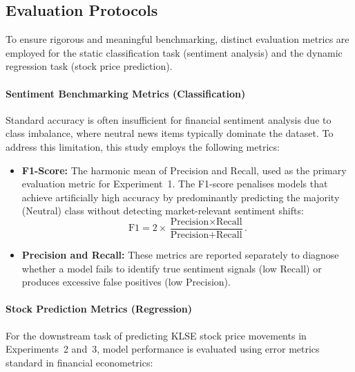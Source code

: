 \documentclass[12pt]{ucetd}
\begin{document}
\subsection{Evaluation Protocols}

To ensure rigorous and meaningful benchmarking, distinct evaluation metrics are employed for the static classification task (sentiment analysis) and the dynamic regression task (stock price prediction).

\paragraph{Sentiment Benchmarking Metrics (Classification)}

Standard accuracy is often insufficient for financial sentiment analysis due to class imbalance, where neutral news items typically dominate the dataset. To address this limitation, this study employs the following metrics:

\begin{itemize}
    \item \textbf{F1-Score:}
    The harmonic mean of Precision and Recall, used as the primary evaluation metric for Experiment~1. The F1-score penalises models that achieve artificially high accuracy by predominantly predicting the majority (Neutral) class without detecting market-relevant sentiment shifts:
    \[
        \text{F1} = 2 \times \frac{\text{Precision} \times \text{Recall}}{\text{Precision} + \text{Recall}}.
    \]

    \item \textbf{Precision and Recall:}
    These metrics are reported separately to diagnose whether a model fails to identify true sentiment signals (low Recall) or produces excessive false positives (low Precision).
\end{itemize}

\paragraph{Stock Prediction Metrics (Regression)}

For the downstream task of predicting KLSE stock price movements in Experiments~2 and~3, model performance is evaluated using error metrics standard in financial econometrics:
\end{document}
